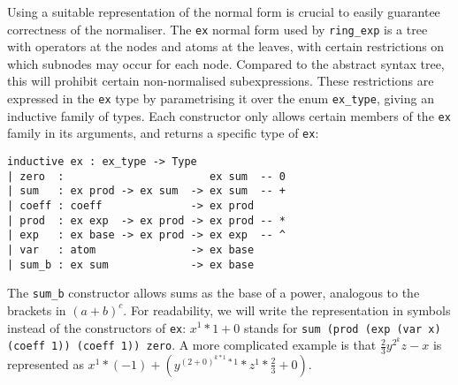 \documentclass{llncs}
\newcommand{\lean}[1]{\texttt{#1}\xspace} %
\newcommand{\ex}{\lean{ex}}
\newcommand{\ring}{\lean{ring}}
\newcommand{\ringexp}{\lean{ring\_exp}}
\begin{document}
Using a suitable representation of the normal form is crucial to easily guarantee correctness of the normaliser.
The \ex normal form used by \ringexp is a tree with operators at the nodes and atoms at the leaves,
with certain restrictions on which subnodes may occur for each node.
Compared to the abstract syntax tree, this will prohibit certain non-normalised subexpressions.
These restrictions are expressed in the \ex type by parametrising it over the enum \lean{ex\_type},
giving an inductive family of types.
Each constructor only allows certain members of the \ex family in its arguments,
and returns a specific type of \ex:

\begin{verbatim}
inductive ex : ex_type -> Type
| zero  :                       ex sum  -- 0
| sum   : ex prod -> ex sum  -> ex sum  -- +
| coeff : coeff              -> ex prod
| prod  : ex exp  -> ex prod -> ex prod -- *
| exp   : ex base -> ex prod -> ex exp  -- ^
| var   : atom               -> ex base
| sum_b : ex sum             -> ex base
\end{verbatim}

The \lean{sum\_b} constructor allows sums as the base of a power, analogous to the brackets in $(a + b) ^ c$.
For readability, we will write the representation in symbols instead of the constructors of \ex: $x^1 * 1 + 0$ stands for \lean{sum (prod (exp (var x) (coeff 1)) (coeff 1)) zero}. 
A more complicated example is that $\frac{2}{3} y^{2^k} z - x$ is represented as $x^1 * (-1) + \left(y^{(2 + 0)^{k * 1} * 1} * z^1 * \frac{2}{3} + 0\right)$.
\end{document}
